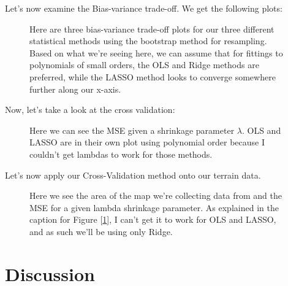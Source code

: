 \documentclass{article}
\begin{document}
\newline
Let's now examine the Bias-variance trade-off. We get the following plots:
\begin{figure}[ht!] \label{fig2}
\centering
{}
\newline
{}
\caption{Here are three bias-variance trade-off plots for our three different statistical methods using the bootstrap method for resampling.\newline
Based on what we're seeing here, we can assume that for fittings to polynomials of small orders, the OLS and Ridge methods are preferred, while the LASSO method looks to converge somewhere further along our x-axis.}
\end{figure}
\newpage
Now, let's take a look at the cross validation:
\begin{figure}[ht!]
\centering
{}
\caption{Here we can see the MSE given a shrinkage parameter $\lambda$. OLS and LASSO are in their own plot using polynomial order because I couldn't get lambdas to work for those methods.}


\end{figure}
\newline
Let's now apply our Cross-Validation method onto our terrain data.
\begin{figure}[ht!]
\centering
{}
\caption{Here we see the area of the map we're collecting data from and the MSE for a given lambda shrinkage parameter. \newline As explained in the caption for Figure [\ref{fig2}], I can't get it to work for OLS and LASSO, and as such we'll be using only Ridge.}
\end{figure}

\section{Discussion}
\end{document}
